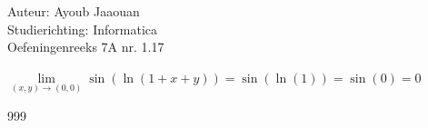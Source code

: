 \documentclass[a4paper]{article}
\newcommand{\llim}{\lim\limits}
\begin{document}
\noindent \large Auteur: Ayoub Jaaouan \\
\noindent \large Studierichting: Informatica\\
\noindent \large Oefeningenreeks 7A nr. 1.17\\
\medskip

\normalsize


$\llim_{(x,y) \rightarrow (0,0)} \sin(\ln(1+x+y))= \sin(\ln(1)) = \sin(0) = 0 $\\

\begin{thebibliography}{999}
\end{thebibliography}
\end{document}
